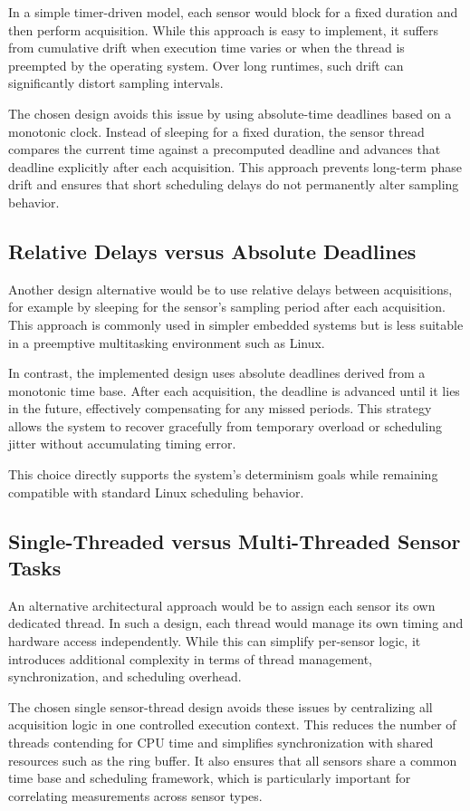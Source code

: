 In a simple timer-driven model, each sensor would block for a fixed duration and then perform acquisition. While this approach is easy to implement, it suffers from cumulative drift when execution time varies or when the thread is preempted by the operating system. Over long runtimes, such drift can significantly distort sampling intervals.

The chosen design avoids this issue by using absolute-time deadlines based on a monotonic clock. Instead of sleeping for a fixed duration, the sensor thread compares the current time against a precomputed deadline and advances that deadline explicitly after each acquisition. This approach prevents long-term phase drift and ensures that short scheduling delays do not permanently alter sampling behavior.

\subsection{Relative Delays versus Absolute Deadlines}
Another design alternative would be to use relative delays between acquisitions, for example by sleeping for the sensor’s sampling period after each acquisition. This approach is commonly used in simpler embedded systems but is less suitable in a preemptive multitasking environment such as Linux.

In contrast, the implemented design uses absolute deadlines derived from a monotonic time base. After each acquisition, the deadline is advanced until it lies in the future, effectively compensating for any missed periods. This strategy allows the system to recover gracefully from temporary overload or scheduling jitter without accumulating timing error.

This choice directly supports the system’s determinism goals while remaining compatible with standard Linux scheduling behavior.

\subsection{Single-Threaded versus Multi-Threaded Sensor Tasks}
An alternative architectural approach would be to assign each sensor its own dedicated thread. In such a design, each thread would manage its own timing and hardware access independently. While this can simplify per-sensor logic, it introduces additional complexity in terms of thread management, synchronization, and scheduling overhead.

The chosen single sensor-thread design avoids these issues by centralizing all acquisition logic in one controlled execution context. This reduces the number of threads contending for CPU time and simplifies synchronization with shared resources such as the ring buffer. It also ensures that all sensors share a common time base and scheduling framework, which is particularly important for correlating measurements across sensor types.

